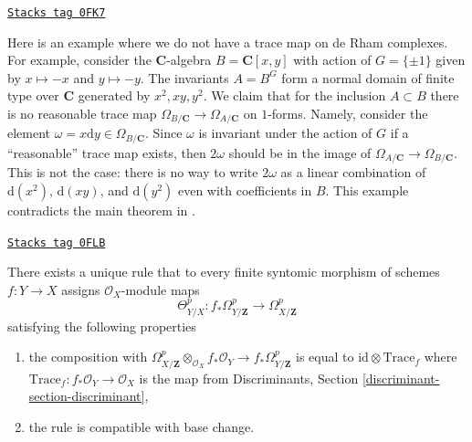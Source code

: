\begin{example}[No trace]
\label{derham-example-no-trace}
\href{https://stacks.math.columbia.edu/tag/0FK7}{\texttt{Stacks tag 0FK7}}

Here is an example where we do not have a trace map on de Rham complexes.
For example, consider the $\mathbf{C}$-algebra $B = \mathbf{C}[x, y]$ with
action of $G = \{\pm 1\}$ given by $x \mapsto -x$ and $y \mapsto -y$.
The invariants $A = B^G$ form a normal domain of finite type over $\mathbf{C}$
generated by $x^2, xy, y^2$. We claim that for the inclusion $A \subset B$
there is no reasonable trace map
$\Omega_{B/\mathbf{C}} \to \Omega_{A/\mathbf{C}}$
on $1$-forms. Namely, consider the element
$\omega = x \text{d} y \in \Omega_{B/\mathbf{C}}$.
Since $\omega$ is invariant under the action of $G$ if a ``reasonable''
trace map exists, then $2\omega$ should be in the image of
$\Omega_{A/\mathbf{C}} \to \Omega_{B/\mathbf{C}}$. This is
not the case: there is no way to write $2\omega$ as a linear
combination of $\text{d}(x^2)$, $\text{d}(xy)$, and $\text{d}(y^2)$
even with coefficients in $B$.
This example contradicts the main theorem in
\cite{Zannier}.
\end{example}

\begin{lemma}[Garel]
\label{derham-lemma-Garel}
\href{https://stacks.math.columbia.edu/tag/0FLB}{\texttt{Stacks tag 0FLB}}

There exists a unique rule that to every finite syntomic
morphism of schemes $f : Y \to X$ assigns $\mathcal{O}_X$-module maps
$$
\Theta^p_{Y/X} :
f_*\Omega^p_{Y/\mathbf{Z}}
\longrightarrow
\Omega^p_{X/\mathbf{Z}}
$$
satisfying the following properties
\begin{enumerate}
\item the composition with
$\Omega^p_{X/\mathbf{Z}} \otimes_{\mathcal{O}_X} f_*\mathcal{O}_Y
\to f_*\Omega^p_{Y/\mathbf{Z}}$ is equal to
$\text{id} \otimes \text{Trace}_f$
where $\text{Trace}_f : f_*\mathcal{O}_Y \to \mathcal{O}_X$
is the map from
Discriminants, Section \ref{discriminant-section-discriminant},
\item the rule is compatible with base change.
\end{enumerate}
\end{lemma}

